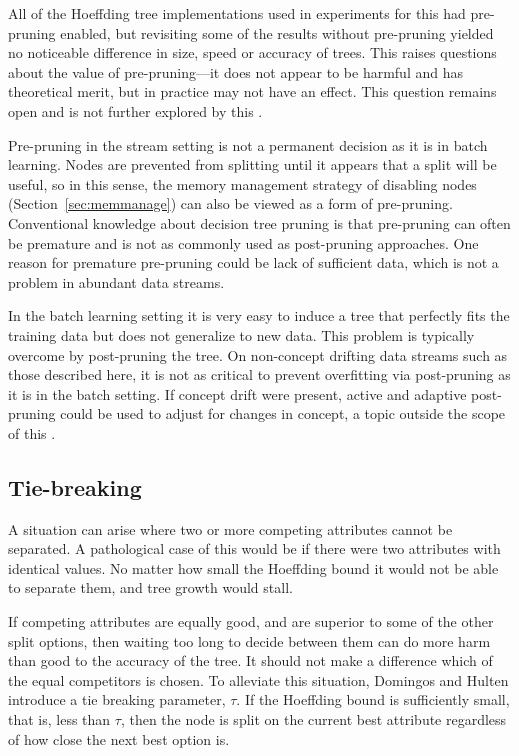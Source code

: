 All of the Hoeffding tree implementations used in experiments for this \thesis  had pre-pruning enabled, but revisiting some of the results without pre-pruning yielded %
no noticeable difference in size, speed or accuracy of trees.
This raises questions about the value of pre-pruning---it does not appear to be harmful and has theoretical merit, but in practice may not have an effect. This question remains open and is not further explored by this \thesisc. 

Pre-pruning in the stream setting is not a permanent decision as it is
in batch learning. Nodes are prevented from splitting until it appears
that a split will be useful, so in this sense, the memory management
strategy of disabling nodes (Section~\ref{sec:memmanage}) can also be viewed as a form of pre-pruning. Conventional knowledge about decision tree pruning is that pre-pruning can often be premature and is not as commonly used as post-pruning approaches. One reason for premature pre-pruning could be lack of sufficient data, which is not a problem in abundant data streams.

In the batch learning setting it is very easy to induce a tree that perfectly fits the training data but does not generalize to new data. This problem is typically overcome by post-pruning the tree. On non-concept drifting data streams such as those described here, it is not as critical to prevent overfitting via post-pruning as it is in the batch setting. If concept drift were present, active and adaptive post-pruning could be used to adjust for changes in concept, a topic outside the scope of this \thesisc. 

\subsection{Tie-breaking}
\label{sec:tiebreak}

A situation can arise where two or more competing attributes cannot be separated. A pathological case of this would be if there were two attributes with identical values. No matter how small the Hoeffding bound it would not be able to separate them, and tree growth would stall.

If competing attributes are equally good, and are superior to some of the other split options, then waiting too long to decide between them can do more harm than good to the accuracy of the tree. It should not make a difference which of the equal competitors is chosen. To alleviate this situation, Domingos and Hulten introduce a tie breaking parameter, $\tau$. If the Hoeffding bound is sufficiently small, that is, less than $\tau$, then the node is split on the current best attribute regardless of how close the next best option is.

